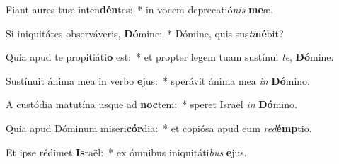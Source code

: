 \item Fiant aures tuæ inten\textbf{dén}tes:~* in vocem deprecatió\textit{nis} \textbf{me}æ.
\item Si iniquitátes observáveris, \textbf{Dó}mine:~* Dómine, quis sus\textit{ti}\textbf{né}bit?
\item Quia apud te propitiáti\textbf{o} est:~* et propter legem tuam sustínui \textit{te}, \textbf{Dó}mine.
\item Sustínuit ánima mea in verbo \textbf{e}jus:~* sperávit ánima mea \textit{in} \textbf{Dó}mino.
\item A custódia matutína usque ad \textbf{noc}tem:~* speret Israël \textit{in} \textbf{Dó}mino.
\item Quia apud Dóminum miseri\textbf{cór}dia:~* et copiósa apud eum \textit{red}\textbf{émp}tio.
\item Et ipse rédimet \textbf{Is}raël:~* ex ómnibus iniquitáti\textit{bus} \textbf{e}jus.
